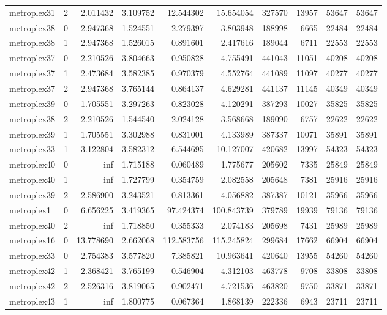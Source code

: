 \begin{longtable}{|l|r|r|r|r|r|r|r|r|r|}
metroplex31 & 2 & 2.011432 & 3.109752 & 12.544302 & 15.654054 & 327570 & 13957 & 53647 & 53647 \\
metroplex38 & 0 & 2.947368 & 1.524551 & 2.279397 & 3.803948 & 188998 & 6665 & 22484 & 22484 \\
metroplex38 & 1 & 2.947368 & 1.526015 & 0.891601 & 2.417616 & 189044 & 6711 & 22553 & 22553 \\
metroplex37 & 0 & 2.210526 & 3.804663 & 0.950828 & 4.755491 & 441043 & 11051 & 40208 & 40208 \\
metroplex37 & 1 & 2.473684 & 3.582385 & 0.970379 & 4.552764 & 441089 & 11097 & 40277 & 40277 \\
metroplex37 & 2 & 2.947368 & 3.765144 & 0.864137 & 4.629281 & 441137 & 11145 & 40349 & 40349 \\
metroplex39 & 0 & 1.705551 & 3.297263 & 0.823028 & 4.120291 & 387293 & 10027 & 35825 & 35825 \\
metroplex38 & 2 & 2.210526 & 1.544540 & 2.024128 & 3.568668 & 189090 & 6757 & 22622 & 22622 \\
metroplex39 & 1 & 1.705551 & 3.302988 & 0.831001 & 4.133989 & 387337 & 10071 & 35891 & 35891 \\
metroplex33 & 1 & 3.122804 & 3.582312 & 6.544695 & 10.127007 & 420682 & 13997 & 54323 & 54323 \\
metroplex40 & 0 & inf & 1.715188 & 0.060489 & 1.775677 & 205602 & 7335 & 25849 & 25849 \\
metroplex40 & 1 & inf & 1.727799 & 0.354759 & 2.082558 & 205648 & 7381 & 25916 & 25916 \\
metroplex39 & 2 & 2.586900 & 3.243521 & 0.813361 & 4.056882 & 387387 & 10121 & 35966 & 35966 \\
metroplex1 & 0 & 6.656225 & 3.419365 & 97.424374 & 100.843739 & 379789 & 19939 & 79136 & 79136 \\
metroplex40 & 2 & inf & 1.718850 & 0.355333 & 2.074183 & 205698 & 7431 & 25989 & 25989 \\
metroplex16 & 0 & 13.778690 & 2.662068 & 112.583756 & 115.245824 & 299684 & 17662 & 66904 & 66904 \\
metroplex33 & 0 & 2.754383 & 3.577820 & 7.385821 & 10.963641 & 420640 & 13955 & 54260 & 54260 \\
metroplex42 & 1 & 2.368421 & 3.765199 & 0.546904 & 4.312103 & 463778 & 9708 & 33808 & 33808 \\
metroplex42 & 2 & 2.526316 & 3.819065 & 0.902471 & 4.721536 & 463820 & 9750 & 33871 & 33871 \\
metroplex43 & 1 & inf & 1.800775 & 0.067364 & 1.868139 & 222336 & 6943 & 23711 & 23711 \\

\end{longtable}
